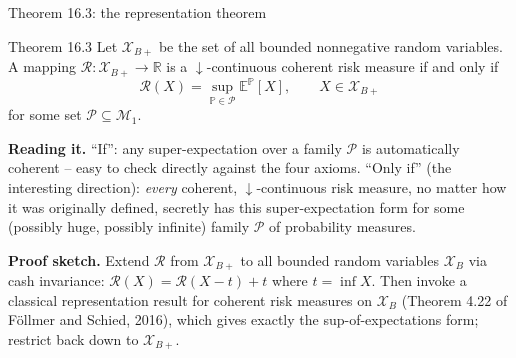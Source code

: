 \documentclass[aspectratio=169,10pt]{beamer}
\newcommand{\PP}{\mathbb{P}}
\newcommand{\EE}{\mathbb{E}}
\newcommand{\RR}{\mathbb{R}}
\newcommand{\1}{\mathbb{1}}
\begin{document}
\begin{frame}{Theorem 16.3: the representation theorem}

\begin{block}{Theorem 16.3}
Let $\mathcal X_{B+}$ be the set of all bounded nonnegative random variables. A mapping $\mathcal R: \mathcal X_{B+}\to \RR$ is a $\downarrow$-continuous coherent risk measure if and only if
\[
\mathcal R(X) = \sup_{\PP \in \mathcal P} \EE^{\PP}[X], \qquad X \in \mathcal X_{B+}
\]
for some set $\mathcal P \subseteq \mathcal M_1$.
\end{block}

\textbf{Reading it.} ``If'': any super-expectation over a family $\mathcal P$ is automatically coherent -- easy to check directly against the four axioms. ``Only if'' (the interesting direction): \emph{every} coherent, $\downarrow$-continuous risk measure, no matter how it was originally defined, secretly has this super-expectation form for some (possibly huge, possibly infinite) family $\mathcal P$ of probability measures.

\vspace{2mm}
\textbf{Proof sketch.} Extend $\mathcal R$ from $\mathcal X_{B+}$ to all bounded random variables $\mathcal X_B$ via cash invariance: $\mathcal R(X) = \mathcal R(X-t)+t$ where $t=\inf X$. Then invoke a classical representation result for coherent risk measures on $\mathcal X_B$ (Theorem 4.22 of F\"ollmer and Schied, 2016), which gives exactly the sup-of-expectations form; restrict back down to $\mathcal X_{B+}$.

\end{frame}
\end{document}
